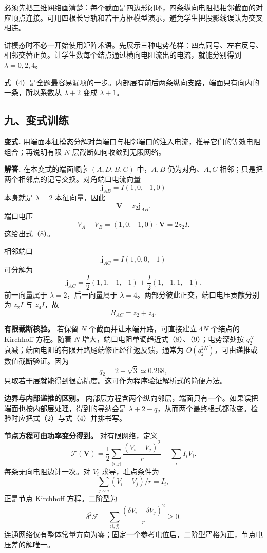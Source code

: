 \documentclass[12pt,a4paper,UTF8]{ctexart}
\begin{document}
必须先把三维网络画清楚：每个截面是四边形闭环，四条纵向电阻把相邻截面的对应顶点连接。可用四根长导轨和若干方框模型演示，避免学生把投影线误认为交叉相连。

讲模态时不必一开始使用矩阵术语。先展示三种电势花样：四点同号、左右反号、相邻交替正负。让学生数每个结点通过横向电阻流出的电流，就能分别得到
\(\lambda=0,2,4\)。

式（4）是全题最容易漏项的一步。内部层有前后两条纵向支路，端面只有向内的一条，所以系数从
\(\lambda+2\) 变成 \(\lambda+1\)。

\subsection{九、变式训练}\label{ux4e5dux53d8ux5f0fux8badux7ec3-5}

\textbf{变式.}
用端面本征模态分解对角端口与相邻端口的注入电流，推导它们的等效电阻组合；再说明有限
\(N\) 层截断如何收敛到无限网络。

\textbf{解答.} 在本变式的端面顺序 \((A,D,B,C)\) 中，\(A,B\)
仍为对角、\(A,C\) 相邻；只是把两个相邻点的记号交换。对角端口电流向量 \[
\boldsymbol j_{AB}=I(1,0,-1,0)
\] 本身就是 \(\lambda=2\) 本征向量，因此 \[
\boldsymbol V=z_2\boldsymbol j_{AB}.
\] 端口电压 \[
V_A-V_B
=(1,0,-1,0)\cdot\boldsymbol V
=2z_2I.
\] 这给出式（8）。

相邻端口 \[
\boldsymbol j_{AC}=I(1,0,0,-1)
\] 可分解为 \[
\boldsymbol j_{AC}
=\frac I2(1,1,-1,-1)
+\frac I2(1,-1,1,-1).
\] 前一向量属于 \(\lambda=2\)，后一向量属于
\(\lambda=4\)。两部分彼此正交，端口电压贡献分别为 \(z_2I\) 与
\(z_4I\)，故 \[
R_{AC}=z_2+z_4.
\]

\textbf{有限截断核验。} 若保留 \(N\) 个截面并让末端开路，可直接建立
\(4N\) 个结点的 Kirchhoff 方程。随着 \(N\)
增大，端口电阻单调趋近式（8）、（9）；电势深处按 \(q_2^N\)
衰减；端面电阻的有限开路尾端修正经往返反馈，通常为
\(O(q_2^{2N})\)，可由递推或数值截断验证。因为 \[
q_2=2-\sqrt3\simeq0.268,
\] 只取若干层就能得到很高精度。这可作为程序验证解析式的简便方法。

\textbf{边界与内部递推的区别。}
内部层方程含两个纵向邻层，端面只有一个。如果误把端面也按内部层处理，得到的导纳会是
\(\lambda+2-q\)，从而两个最终根式都改变。检验时应把式（2）与式（4）并排书写。

\textbf{节点方程可由功率变分得到。} 对有限网络，定义 \[
\mathcal F(\bm V)=\frac12\sum_{\langle i,j\rangle}
\frac{(V_i-V_j)^2}{r}-\sum_iI_iV_i.
\] 每条无向电阻边计一次。对 \(V_i\) 求导，驻点条件为 \[
\sum_{j\sim i}(V_i-V_j)/r=I_i,
\] 正是节点 Kirchhoff 方程。二阶型为 \[
\delta^2\mathcal F=\sum_{\langle i,j\rangle}
\frac{(\delta V_i-\delta V_j)^2}{r}\ge0.
\]
连通网络仅有整体常量方向为零；固定一个参考电位后，二阶型严格为正，节点电压差的解唯一。
\end{document}
